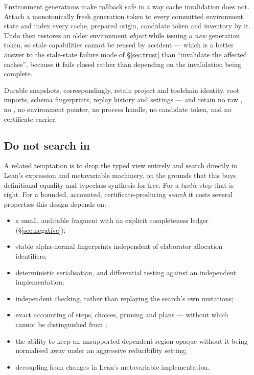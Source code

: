 Environment generations make rollback safe in a way cache invalidation does
not. Attach a monotonically fresh generation token to every committed
environment state and index every cache, prepared origin, candidate token and
inventory by it. Undo then restores an older environment \emph{object} while
issuing a \emph{new} generation token, so stale capabilities cannot be reused
by accident --- which is a better answer to the stale-state failure mode of
\S\ref{sec:trust} than ``invalidate the affected caches'', because it fails
closed rather than depending on the invalidation being complete.

Durable snapshots, correspondingly, retain project and toolchain identity, root
imports, schema fingerprints, replay history and settings --- and retain no raw
, no , no environment pointer, no process handle, no
candidate token, and no certificate carrier.

\subsection{Do not search in \texorpdfstring{}{Expr}}
\label{sec:search-ir}

A related temptation is to drop the typed view entirely and search directly in
Lean's expression and metavariable machinery, on the grounds that this buys
definitional equality and typeclass synthesis for free. For a \emph{tactic}
step that is right. For a bounded, accounted, certificate-producing
\emph{search} it costs several properties this design depends on:

\begin{itemize}[leftmargin=1.4em]
\item a small, auditable fragment with an explicit completeness ledger
  (\S\ref{sec:negative});
\item stable alpha-normal fingerprints independent of elaborator allocation
  identifiers;
\item deterministic serialisation, and differential testing against an
  independent implementation;
\item independent checking, rather than replaying the search's own mutations;
\item exact accounting of steps, choices, pruning and plans --- without which
   cannot be distinguished from ;
\item the ability to keep an unsupported dependent region opaque without it
  being normalised away under an aggressive reducibility setting;
\item decoupling from changes in Lean's metavariable implementation.
\end{itemize}


